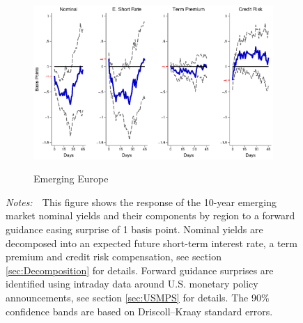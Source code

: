 \documentclass[a4paper, 12pt]{article}
\newcommand{\figtext}[1]{
	\vspace{-1ex}
	\captionsetup{justification=justified,font=footnotesize}
	\caption*{#1}
}
\newcommand{\fignotes}[1]{\figtext{\emph{Notes:~}~#1}}
\begin{document}
\begin{appendices}
\begin{landscape}
\begin{figure}[tbph]
\begin{center}
\begin{minipage}{\linewidth}
\begin{center}
						\begin{subfigure}[t]{\linewidth}
							\includegraphics[trim={0cm 0cm 0cm 0cm},clip,height=0.35\textheight,width=\linewidth]{../Figures/PathEEnomyptpphi120m.eps} \\
							\vspace{-0.35cm}
							\caption{Emerging Europe} \label{subfig:LPEE10Ypath}
						\end{subfigure}
						\vspace{-0.45cm}
					\end{center}
					\fignotes{This figure shows the response of the 10-year emerging market nominal yields and their components by region to a forward guidance easing surprise of 1 basis point. Nominal yields are decomposed into an expected future short-term interest rate, a term premium and credit risk compensation, see section \ref{sec:Decomposition} for details. Forward guidance surprises are identified using intraday data around U.S. monetary policy announcements, see section \ref{sec:USMPS} for details. The 90\% confidence bands are based on Driscoll--Kraay standard errors.}
				\end{minipage}
			\end{center}
		\end{figure}
		
		\pagebreak[4]
		

\end{landscape}
\end{appendices}
\end{document}
